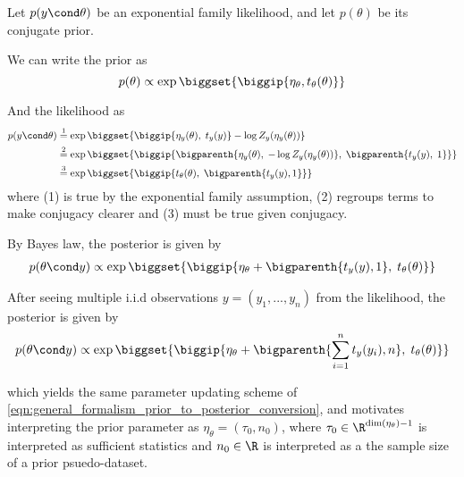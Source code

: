 Let $p(y \cond \theta)$ be an exponential family likelihood, and let $p(\theta)$ be its conjugate prior. 

We can write the prior as 
\[p(\theta ) \propto \exp \biggset{\biggip{\eta_\theta, t_\theta (\theta)}} \]

And the likelihood as 
\begin{align*}
p(y \cond \theta)  & \stackrel{1}{=} \exp \biggset{ \biggip{\eta_y(\theta), \;  t_y(y)} - \log Z_y (\eta_y(\theta)) } \\
& \stackrel{2}{=} \exp \biggset{ \biggip{ \bigparenth{\eta_y(\theta), \; - \log Z_y (\eta_y(\theta))}, \; \bigparenth{t_y(y), \; 1}}  } \\
& \stackrel{3}{=} \exp \biggset{ \biggip{t_\theta(\theta), \; \bigparenth{t_y(y),1}}}   
\end{align*}
where (1) is true by the exponential family assumption, (2) regroups terms to make conjugacy clearer and (3) must be true given conjugacy. 


By Bayes law, the posterior is given by
\begin{align*}
p(\theta \cond y)  \propto \exp \biggset{ \biggip{ \eta_\theta + \bigparenth{t_y(y),1}, \;   t_\theta(\theta) }} 
\end{align*}
  
After seeing multiple i.i.d observations $y=(y_1,...,y_n)$ from the likelihood, the posterior is given by
\begin{align*}
p(\theta \cond y)  \propto \exp \biggset{ \biggip{ \eta_\theta + \bigparenth{ \sum_{i=1}^n t_y(y_i),n}, \;   t_\theta(\theta) }} 
\end{align*}

which yields the same parameter updating scheme of \eqref{eqn:general_formalism_prior_to_posterior_conversion}, and motivates interpreting the prior parameter as $\eta_\theta = (\tau_0, n_0)$, where $\tau_0 \in \R^{\dim(\eta_\theta) - 1}$ is interpreted as sufficient statistics and $n_0 \in \R$ is interpreted as a the sample size of a prior psuedo-dataset. 
